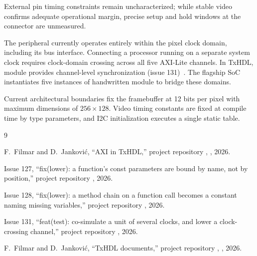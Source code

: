 \documentclass[journal,9pt]{IEEEtran}
\begin{document}
External pin timing constraints remain uncharacterized; while stable video
confirms adequate operational margin, precise setup and hold windows at the
connector are unmeasured.

The peripheral currently operates entirely within the pixel clock domain,
including its bus interface. Connecting a processor running on a separate
system clock requires clock-domain crossing across all five AXI-Lite
channels. In TxHDL, module  provides channel-level
synchronization (issue 131)~\cite{i131}. The flagship SoC instantiates five
instances of handwritten module  to bridge these domains.

Current architectural boundaries fix the framebuffer at 12 bits per pixel
with maximum dimensions of $256 \times 128$. Video timing constants are
fixed at compile time by type parameters, and I2C initialization executes
a single static table.

\begin{thebibliography}{9}

F.~Filmar and D.~Janković, ``AXI in TxHDL,'' project repository
, , 2026.

Issue 127, ``fix(lower): a function's const parameters are bound by
name, not by position,'' project repository , 2026.

Issue 128, ``fix(lower): a method chain on a function call becomes a
constant naming missing variables,'' project repository
, 2026.

Issue 131, ``feat(test): co-simulate a unit of several clocks, and
lower a clock-crossing channel,'' project repository ,
2026.

F.~Filmar and D.~Janković, ``TxHDL documents,'' project repository
, , 2026.

\end{thebibliography}
\end{document}
